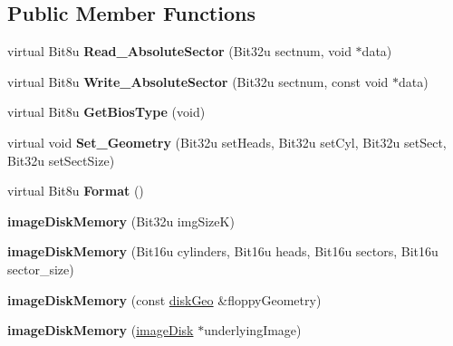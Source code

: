 \subsection*{Public Member Functions}
\begin{DoxyCompactItemize}
\item 
\hypertarget{classimageDiskMemory_a67a4fdb7bfea226898ca6c9801350708}{virtual Bit8u {\bfseries Read\-\_\-\-Absolute\-Sector} (Bit32u sectnum, void $\ast$data)}\label{classimageDiskMemory_a67a4fdb7bfea226898ca6c9801350708}

\item 
\hypertarget{classimageDiskMemory_aeb828d76bb273e76bb7a5c7f6f333c9c}{virtual Bit8u {\bfseries Write\-\_\-\-Absolute\-Sector} (Bit32u sectnum, const void $\ast$data)}\label{classimageDiskMemory_aeb828d76bb273e76bb7a5c7f6f333c9c}

\item 
\hypertarget{classimageDiskMemory_a608088213822277c5fa95c90929d4ec2}{virtual Bit8u {\bfseries Get\-Bios\-Type} (void)}\label{classimageDiskMemory_a608088213822277c5fa95c90929d4ec2}

\item 
\hypertarget{classimageDiskMemory_a72accc9b21eae2c51f9960803501e221}{virtual void {\bfseries Set\-\_\-\-Geometry} (Bit32u set\-Heads, Bit32u set\-Cyl, Bit32u set\-Sect, Bit32u set\-Sect\-Size)}\label{classimageDiskMemory_a72accc9b21eae2c51f9960803501e221}

\item 
\hypertarget{classimageDiskMemory_a23db6ca32da16437703d513ad9500138}{virtual Bit8u {\bfseries Format} ()}\label{classimageDiskMemory_a23db6ca32da16437703d513ad9500138}

\item 
\hypertarget{classimageDiskMemory_ae32d8a89882a15795e0199b0c0f08df3}{{\bfseries image\-Disk\-Memory} (Bit32u img\-Size\-K)}\label{classimageDiskMemory_ae32d8a89882a15795e0199b0c0f08df3}

\item 
\hypertarget{classimageDiskMemory_aa9aae8f710e4a8bef720e54f9af03ddc}{{\bfseries image\-Disk\-Memory} (Bit16u cylinders, Bit16u heads, Bit16u sectors, Bit16u sector\-\_\-size)}\label{classimageDiskMemory_aa9aae8f710e4a8bef720e54f9af03ddc}

\item 
\hypertarget{classimageDiskMemory_aa2f4f1d96620f78e400807910b9a2e8f}{{\bfseries image\-Disk\-Memory} (const \hyperlink{structdiskGeo}{disk\-Geo} \&floppy\-Geometry)}\label{classimageDiskMemory_aa2f4f1d96620f78e400807910b9a2e8f}

\item 
\hypertarget{classimageDiskMemory_a45479f6fe646d2e184809cd5c37dc1d8}{{\bfseries image\-Disk\-Memory} (\hyperlink{classimageDisk}{image\-Disk} $\ast$underlying\-Image)}\label{classimageDiskMemory_a45479f6fe646d2e184809cd5c37dc1d8}

\end{DoxyCompactItemize}


